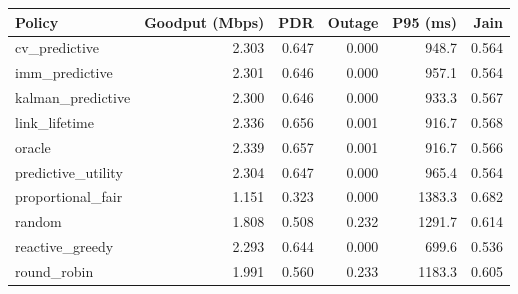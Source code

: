 \begin{tabular}{lrrrrr}
\toprule
Policy & Goodput (Mbps) & PDR & Outage & P95 (ms) & Jain \\
\midrule
cv\_predictive & 2.303 & 0.647 & 0.000 & 948.7 & 0.564 \\
imm\_predictive & 2.301 & 0.646 & 0.000 & 957.1 & 0.564 \\
kalman\_predictive & 2.300 & 0.646 & 0.000 & 933.3 & 0.567 \\
link\_lifetime & 2.336 & 0.656 & 0.001 & 916.7 & 0.568 \\
oracle & 2.339 & 0.657 & 0.001 & 916.7 & 0.566 \\
predictive\_utility & 2.304 & 0.647 & 0.000 & 965.4 & 0.564 \\
proportional\_fair & 1.151 & 0.323 & 0.000 & 1383.3 & 0.682 \\
random & 1.808 & 0.508 & 0.232 & 1291.7 & 0.614 \\
reactive\_greedy & 2.293 & 0.644 & 0.000 & 699.6 & 0.536 \\
round\_robin & 1.991 & 0.560 & 0.233 & 1183.3 & 0.605 \\
\bottomrule
\end{tabular}
